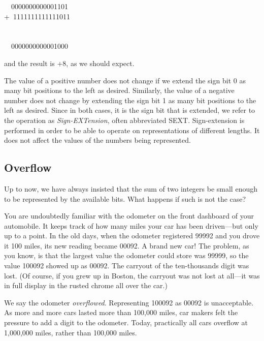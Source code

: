 \documentclass{patt}
\begin{document}
\begin{cctable}
~~0000000000001101\\
+~1111111111111011\\
\\[-17pt]\\[-2pt]
~~0000000000001000
\end{cctable}

\noindent
and the result is ${+}8$, as we should expect.

The value of a positive number does not change if we
extend the sign bit 0 as many bit positions to the left as
desired.  Similarly, the value of a negative number does not
change by extending the sign bit 1 as many bit positions
to the left as desired. \lightbulb[-24pt] Since in both cases, it is the sign
bit that is extended, we refer to the operation as
{\em Sign-EXTension}, often abbreviated SEXT.  Sign-extension
is performed in order to be able to operate on representations
of different lengths.  It does not affect the values of the
numbers being represented.

\subsection{Overflow}

Up to now, we have always insisted that the sum
of two integers be small enough
to be represented by the available bits.  What happens if
such is not the case?

You are undoubtedly familiar with the odometer on the front dashboard
of your automobile.  It keeps track of how many miles your car has
been driven---but only up to a point.  In the old days, when the\vadjust{\pagebreak}
odometer registered 99992 and you drove it 100 miles, its new reading
became 00092.  A brand new car!  The problem, as you know, is that the
largest value the odometer could store was 99999, so the value 100092
showed up as 00092.  The carryout of the ten-thousands digit was lost.
(Of course, if you grew up in Boston, the carryout was not lost at
all---it was in full display in the rusted chrome all over the car.)

We say the odometer \textit{overflowed}. Representing 100092 as 00092
is unacceptable. As more and more cars lasted more than 100{,}000
miles, car makers felt the pressure to add a digit to the odometer.
Today, practically all cars overflow at 1,000,000 miles, rather than
100,000 miles.
\end{document}
